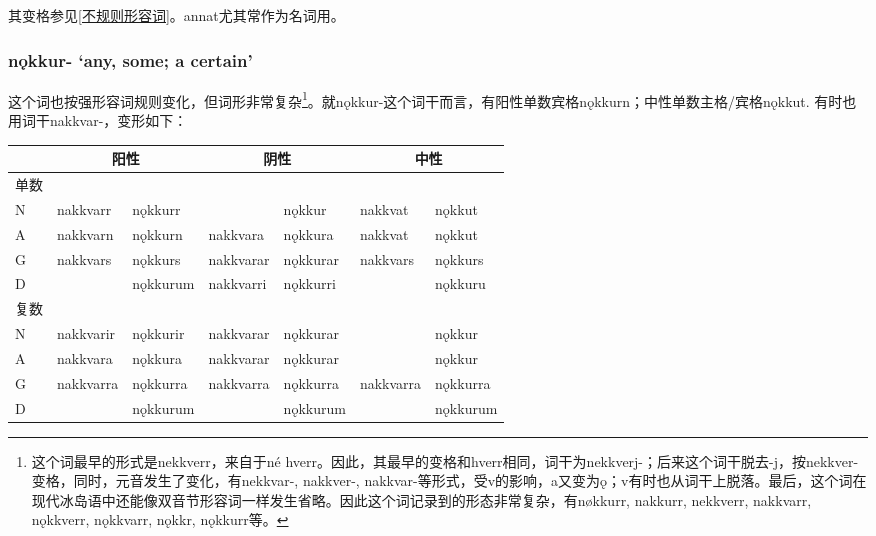 其变格参见\ref{不规则形容词}。annat尤其常作为名词用。

\subsubsection{nǫkkur- `any, some; a certain‌'}

这个词也按强形容词规则变化，但词形非常复杂\footnote{这个词最早的形式是nekkverr，来自于né hverr。因此，其最早的变格和hverr相同，词干为nekkverj-；后来这个词干脱去-j，按nekkver-变格，同时，元音发生了变化，有nekkvar-, nakkver-, nakkvar-等形式，受v的影响，a又变为ǫ；v有时也从词干上脱落。最后，这个词在现代冰岛语中还能像双音节形容词一样发生省略。因此这个词记录到的形态非常复杂，有nøkkurr, nakkurr, nekkverr, nakkvarr, nǫkkverr, nǫkkvarr, nǫkkr, nǫkkurr等。}。就nǫkkur-这个词干而言，有阳性单数宾格nǫkkurn；中性单数主格/宾格nǫkkut.
有时也用词干nakkvar-，变形如下：

\begin{longtable}{lllllll}
    \toprule
         & \multicolumn{2}{c}{阳性} & \multicolumn{2}{c}{阴性} & \multicolumn{2}{c}{中性}                                   \\
    \midrule
    \endhead
    \bottomrule
    \endfoot
    单数 &                          &                          &                          &          &           &          \\
    N    & nakkvarr                 & nǫkkurr                  &                          & nǫkkur   & nakkvat   & nǫkkut   \\
    A    & nakkvarn                 & nǫkkurn                  & nakkvara                 & nǫkkura  & nakkvat   & nǫkkut   \\
    G    & nakkvars                 & nǫkkurs                  & nakkvarar                & nǫkkurar & nakkvars  & nǫkkurs  \\
    D    &                          & nǫkkurum                 & nakkvarri                & nǫkkurri &           & nǫkkuru  \\
    复数 &                          &                          &                          &          &           &          \\
    N    & nakkvarir                & nǫkkurir                 & nakkvarar                & nǫkkurar &           & nǫkkur   \\
    A    & nakkvara                 & nǫkkura                  & nakkvarar                & nǫkkurar &           & nǫkkur   \\
    G    & nakkvarra                & nǫkkurra                 & nakkvarra                & nǫkkurra & nakkvarra &
    nǫkkurra                                                                                                                \\
    D    &                          & nǫkkurum                 &                          & nǫkkurum &           & nǫkkurum \\
\end{longtable}

